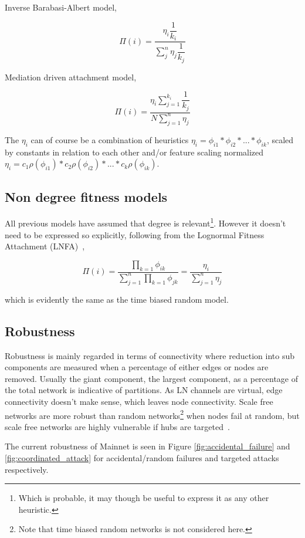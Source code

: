 Inverse Barabasi-Albert model,

\[ \Pi(i) =  \dfrac{\eta_i\dfrac{1}{k_i}}{\sum_{j}^{n}\eta_j \dfrac{1}{k_j}} \]

Mediation driven attachment model,

\[ \Pi(i) = \dfrac{\eta_i\sum_{j=1}^{k_i}\dfrac{1}{k_j}}{N\sum_{j=1}^{n}\eta_j} \]

The $\eta_i$ can of course be a combination of heuristics $\eta_i = \phi_{i1} * \phi_{i2} * ... * \phi_{ik}$, scaled by constants in relation to each other and/or feature scaling normalized $\eta_i = c_1\rho(\phi_{i1}) * c_2\rho(\phi_{i2}) * ... * c_k\rho(\phi_{ik})$.

\subsection{Non degree fitness models}

All previous models have assumed that degree is relevant\footnote{Which is probable, it may though be useful to express it as any other heuristic.}. However it doesn't need to be expressed so explicitly, following from the Lognormal  Fitness Attachment (LNFA)~\cite{bell:logonormal},

\[ \Pi(i) = \dfrac{\prod_{k=1}\phi_{ik}}{\sum_{j=1}^n\prod_{k=1} \phi_{jk}} = \dfrac{\eta_i}{\sum_{j=1}^{n} \eta_j} \]

which is evidently the same as the time biased random model. 

\subsection{Robustness}

Robustness is mainly regarded in terms of connectivity where reduction into sub components are measured when a percentage of either edges or nodes are removed. Usually the giant component, the largest component, as a percentage of the total network is indicative of partitions. As LN channels are virtual, edge connectivity doesn't make sense, which leaves node connectivity. Scale free networks are more robust than random networks\footnote{Note that time biased random networks is not considered here.} when nodes fail at random, but scale free networks are highly vulnerable if hubs are targeted~\cite{barabasi:robustness}. 

The current robustness of Mainnet is seen in Figure \ref{fig:accidental_failure} and \ref{fig:coordinated_attack} for accidental/random failures and targeted attacks respectively.

